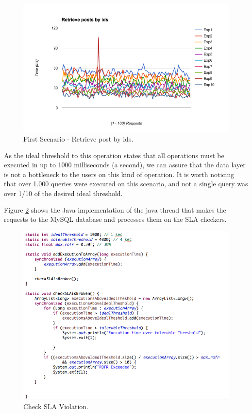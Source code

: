\begin{figure}[ht!]
\centering
\includegraphics[width=150mm]{Imagens/execution-01.png}
\caption{First Scenario - Retrieve post by ids.\label{fig:first_scenario}}
\end{figure}

As the ideal threshold to this operation states that all operations must be executed in up to 1000 milliseconds (a second), we can assure that the data layer is not a bottleneck to the users on this kind of operation. It is worth noticing that over 1.000 queries were executed on this scenario, and not a single query was over 1/10 of the desired ideal threshold. 

Figure \ref{fig:sla_check} shows the Java implementation of the java thread that makes the requests to the MySQL database and processes them on the SLA checkers.

\begin{figure}[ht!]
\centering
\includegraphics[width=120mm]{Imagens/check_sla.png}
\caption{Check SLA Violation.\label{fig:sla_check}}
\end{figure}

